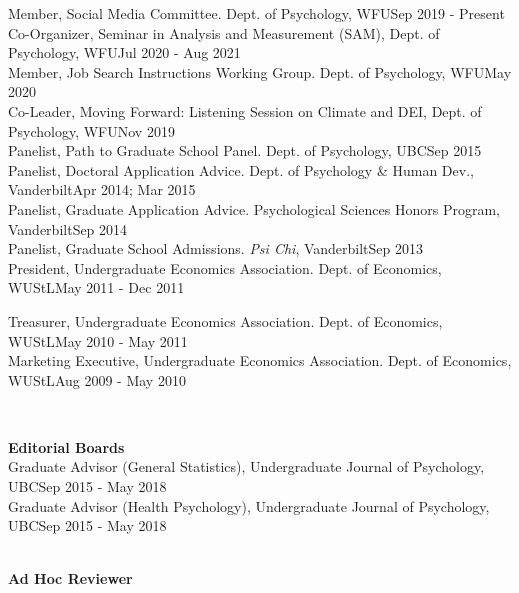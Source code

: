 Member, Social Media Committee. Dept. of Psychology, WFU\hfill {Sep 2019 - Present}\smallskip\\
Co-Organizer, Seminar in Analysis and Measurement (SAM), Dept. of Psychology, WFU\hfill {Jul 2020 - Aug 2021}\smallskip\\
Member, Job Search Instructions Working Group. Dept. of Psychology, WFU\hfill {May 2020}\smallskip\\
Co-Leader, Moving Forward: Listening Session on Climate and DEI, Dept. of Psychology, WFU\hfill {Nov 2019}\smallskip\\
Panelist, Path to Graduate School Panel. Dept. of Psychology, UBC\hfill {Sep 2015}\smallskip\\
Panelist, Doctoral Application Advice. Dept. of Psychology \& Human Dev., Vanderbilt\hfill {Apr 2014; Mar 2015}\smallskip\\
Panelist, Graduate Application Advice. Psychological Sciences Honors Program, Vanderbilt\hfill {Sep 2014}\smallskip\\
Panelist, Graduate School Admissions. \textit{Psi Chi}, Vanderbilt\hfill{Sep 2013}\smallskip\\
President, Undergraduate Economics Association. Dept. of Economics, WUStL\hfill{May 2011 - Dec 2011}\smallskip\\
\begin{minipage}{\linewidth}\vspace{1.1mm} Treasurer, Undergraduate Economics Association. Dept. of Economics, WUStL\hfill{May 2010 - May 2011}\smallskip\\
Marketing Executive, Undergraduate Economics Association. Dept. of Economics, WUStL\hfill {Aug 2009 - May 2010}\end{minipage}\medskip\\
%
%
\begin{minipage}{\linewidth}\vspace{1.1mm} {\large \textbf{Editorial Boards}}\\
Graduate Advisor (General Statistics), Undergraduate Journal of Psychology, UBC\hfill{Sep 2015 - May 2018}\smallskip\\
Graduate Advisor (Health Psychology), Undergraduate Journal of Psychology, UBC\hfill{Sep 2015 - May 2018}\end{minipage}\medskip\\
%
{\large \textbf{Ad Hoc Reviewer}}\smallskip\\

